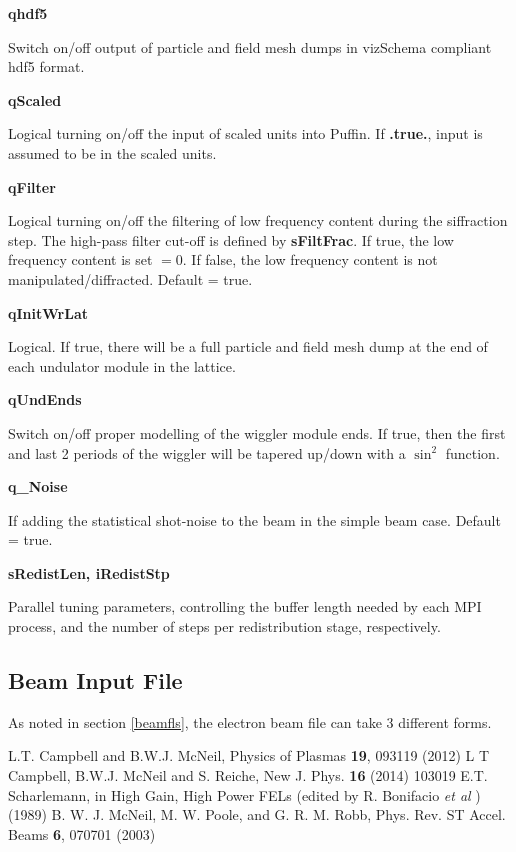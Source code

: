 \documentclass[12pt]{article}%
\begin{document}
{\bf qhdf5}

Switch on/off output of particle and field mesh dumps in vizSchema compliant hdf5 format.

{\bf qScaled}

Logical turning on/off the input of scaled units into Puffin. If {\bf .true.}, input is assumed to be in the scaled units. 

{\bf qFilter}

Logical turning on/off the filtering of low frequency content during the siffraction step. The high-pass filter cut-off is defined by {\bf sFiltFrac}. If true, the low frequency content is set $=0$. If false, the low frequency content is not manipulated/diffracted. Default = true.

{\bf qInitWrLat}

Logical. If true, there will be a full particle and field mesh dump at the end of each undulator module in the lattice.

{\bf qUndEnds}

Switch on/off proper modelling of the wiggler module ends. If true, then the first and last 2 periods of the wiggler will be tapered up/down with a $\sin^2$ function.

{\bf q\_Noise}

If adding the statistical shot-noise to the beam in the simple beam case. Default = true.

{\bf sRedistLen, iRedistStp}

Parallel tuning parameters, controlling the buffer length needed by each MPI process, and the number of steps per redistribution stage, respectively.

\newpage

\subsection{Beam Input File}

As noted in section \ref{beamfls}, the electron beam file can take 3 different forms.


\newpage

\begin{thebibliography}{10}

L.T. Campbell and B.W.J. McNeil, Physics of Plasmas {\bf 19}, 093119 (2012)
L T Campbell, B.W.J. McNeil and S. Reiche, New J. Phys. {\bf 16} (2014) 103019
E.T. Scharlemann, in High Gain, High Power FELs (edited by R. Bonifacio \textit{et al} ) (1989)
B. W. J. McNeil, M. W. Poole, and G. R. M. Robb, Phys. Rev. ST Accel. Beams {\bf 6}, 070701 (2003)


\end{thebibliography}
\end{document}
